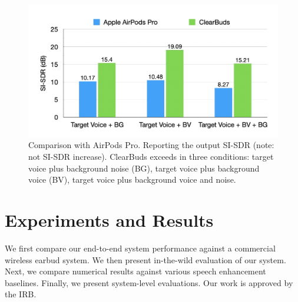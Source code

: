\documentclass [11pt, proquest] {uwthesis}[2020/02/24]
\begin{document}
\begin{figure}
\vskip -0.1in
\centering
\includegraphics[width=0.65\linewidth]{CB_figures/AirPods_study_graph.png}
\vskip -0.2in
\caption{Comparison with AirPods Pro. Reporting the output SI-SDR (note: not SI-SDR increase). ClearBuds exceeds in three conditions: target voice plus background noise (BG), target voice plus background voice (BV), target voice plus background voice and noise.} %
\vskip -0.15in
\label{fig:airpods}
\end{figure}

\section{Experiments and Results}

We first compare our end-to-end system performance against a commercial  wireless earbud system. We then present in-the-wild evaluation of our system. Next, we compare numerical results against various speech enhancement baselines. Finally, we present system-level evaluations. Our work is approved by the IRB.
\end{document}
